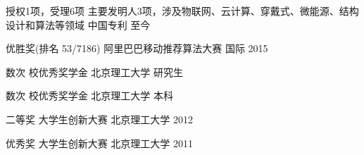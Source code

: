 




\begin{cvhonors}

\cvhonor
{授权1项，受理6项} %
{主要发明人3项，涉及物联网、云计算、穿戴式、微能源、结构设计和算法等领域} %
{中国专利} %
{至今} %

\cvhonor
{优胜奖(排名 53/7186)} %
{阿里巴巴移动推荐算法大赛} %
{ 国际} %
{2015} %

\cvhonor
{数次} %
{校优秀奖学金} %
{北京理工大学} %
{研究生} %


\cvhonor
{数次} %
{校优秀奖学金} %
{北京理工大学} %
{本科} %


\cvhonor
{二等奖} %
{大学生创新大赛} %
{北京理工大学} %
{2012} %


\cvhonor
{优秀奖} %
{大学生创新大赛} %
{北京理工大学} %
{2011} %






\end{cvhonors}
